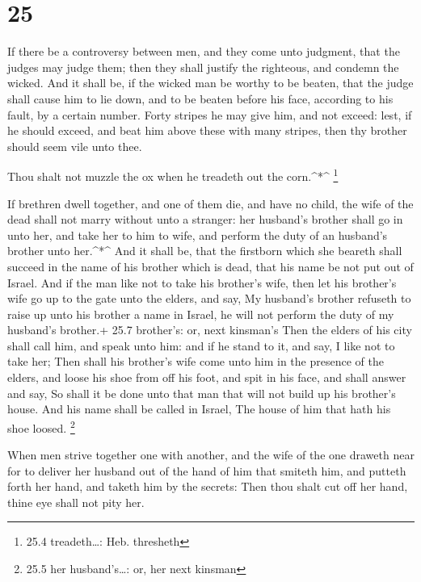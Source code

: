 \hypertarget{section-24}{%
\section{25}\label{section-24}}

 If there be a controversy between men, and they come unto
judgment, that the judges may judge them; then they shall justify the
righteous, and condemn the wicked.  And it shall be, if the
wicked man be worthy to be beaten, that the judge shall cause him to lie
down, and to be beaten before his face, according to his fault, by a
certain number.  Forty stripes he may give him, and not
exceed: lest, if he should exceed, and beat him above these with many
stripes, then thy brother should seem vile unto thee.

 Thou shalt not muzzle the ox when he treadeth out the
corn.\^{}*\^{} \footnote{25.4 treadeth\ldots: Heb. thresheth}

 If brethren dwell together, and one of them die, and have
no child, the wife of the dead shall not marry without unto a stranger:
her husband's brother shall go in unto her, and take her to him to wife,
and perform the duty of an husband's brother unto her.\^{}*\^{}
 And it shall be, that the firstborn which she beareth shall
succeed in the name of his brother which is dead, that his name be not
put out of Israel.  And if the man like not to take his
brother's wife, then let his brother's wife go up to the gate unto the
elders, and say, My husband's brother refuseth to raise up unto his
brother a name in Israel, he will not perform the duty of my husband's
brother.+ 25.7 brother's: or, next kinsman's  Then the
elders of his city shall call him, and speak unto him: and if he stand
to it, and say, I like not to take her;  Then shall his
brother's wife come unto him in the presence of the elders, and loose
his shoe from off his foot, and spit in his face, and shall answer and
say, So shall it be done unto that man that will not build up his
brother's house.  And his name shall be called in Israel,
The house of him that hath his shoe loosed. \footnote{25.5 her
  husband's\ldots: or, her next kinsman}

 When men strive together one with another, and the wife of
the one draweth near for to deliver her husband out of the hand of him
that smiteth him, and putteth forth her hand, and taketh him by the
secrets:  Then thou shalt cut off her hand, thine eye shall
not pity her.

